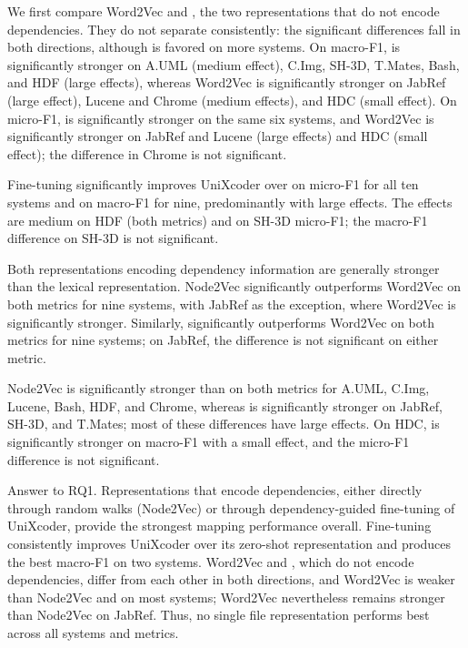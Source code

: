 We first compare Word2Vec and \zs{}, the two representations that do not encode dependencies. They do not separate consistently: the significant differences fall in both directions, although \zs{} is favored on more systems. On macro-F1, \zs{} is significantly stronger on A.UML (medium effect), C.Img, SH-3D, T.Mates, Bash, and HDF (large effects), whereas Word2Vec is significantly stronger on JabRef (large effect), Lucene and Chrome (medium effects), and HDC (small effect). On micro-F1, \zs{} is significantly stronger on the same six systems, and Word2Vec is significantly stronger on JabRef and Lucene (large effects) and HDC (small effect); the difference in Chrome is not significant.

Fine-tuning significantly improves UniXcoder over \zs{} on micro-F1 for all ten systems and on macro-F1 for nine, predominantly with large effects. The effects are medium on HDF (both metrics) and on SH-3D micro-F1; the macro-F1 difference on SH-3D is not significant.

Both representations encoding dependency information are generally stronger than the lexical representation. Node2Vec significantly outperforms Word2Vec on both metrics for nine systems, with JabRef as the exception, where Word2Vec is significantly stronger. Similarly, \ft{} significantly outperforms Word2Vec on both metrics for nine systems; on JabRef, the difference is not significant on either metric.

Node2Vec is significantly stronger than \ft{} on both metrics for A.UML, C.Img, Lucene, Bash, HDF, and Chrome, whereas \ft{} is significantly stronger on JabRef, SH-3D, and T.Mates; most of these differences have large effects. On HDC, \ft{} is significantly stronger on macro-F1 with a small effect, and the micro-F1 difference is not significant.

\begin{GrayBox}{Answer to RQ1.}
Representations that encode dependencies, either directly through random walks (Node2Vec) or through dependency-guided fine-tuning of UniXcoder, provide the strongest mapping performance overall. Fine-tuning consistently improves UniXcoder over its zero-shot representation and produces the best macro-F1 on two systems. Word2Vec and \zs{}, which do not encode dependencies, differ from each other in both directions, and Word2Vec is weaker than Node2Vec and \ft{} on most systems; Word2Vec nevertheless remains stronger than Node2Vec on JabRef. Thus, no single file representation performs best across all systems and metrics.
\end{GrayBox}
